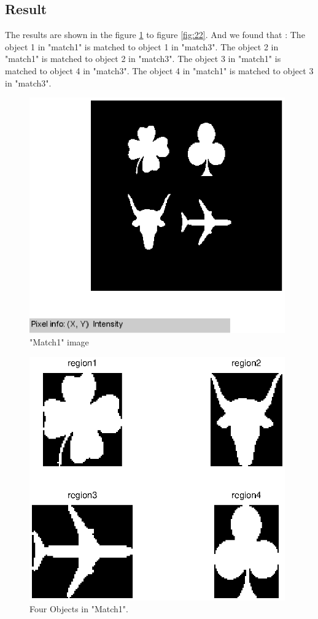 \documentclass[paper=a4, fontsize=11pt]{scrartcl}
\begin{document}
\subsection{ Result }

The results are shown in the figure \ref{fig:15} to figure \ref{fig:22}. And we found that : The object 1 in "match1" is matched to object 1 in "match3".  The object 2 in "match1" is matched to object 2 in "match3".   The object 3 in "match1" is matched to object 4 in "match3".  The object  4 in "match1" is matched to object 3 in "match3". 

 
\begin{figure}
	\centering
	\includegraphics[width=11cm]{match1.eps}
	\caption{"Match1" image}
	\label{fig:15}
\end{figure}

\begin{figure}
	\centering
	\includegraphics[width=11cm]{original4object.eps}
	\caption{Four Objects in "Match1". }
	\label{fig:16}
\end{figure}
\end{document}
